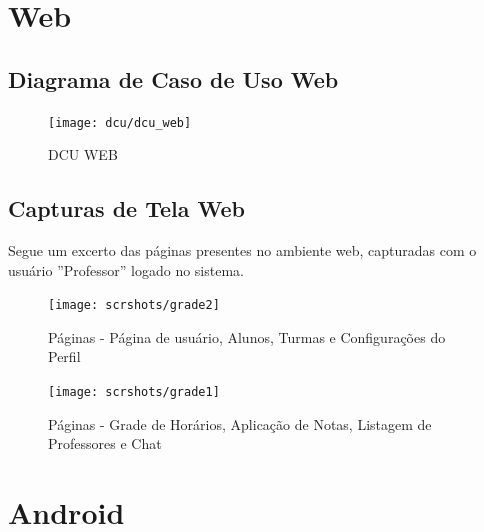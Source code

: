 \documentclass[main.tex]{subfiles}
\begin{document}
\section{Web}

\subsection{Diagrama de Caso de Uso Web}
\begin{figure}[H]
    \centering
    \texttt{[image: dcu/dcu\_web]}
    \caption{DCU WEB}
\end{figure}


%

\subsection{Capturas de Tela Web}
Segue um excerto das páginas presentes no ambiente web, capturadas com o usuário ''Professor'' logado no sistema.

\begin{figure}[H]
    \centering
    \hspace*{-0.7cm} %
    \texttt{[image: scrshots/grade2]}
    \centering
    \caption{Páginas - Página de usuário, Alunos, Turmas e Configurações do Perfil}
\end{figure}
\begin{figure}[H]
    \centering
    \hspace*{-0.7cm} %
    \texttt{[image: scrshots/grade1]}
    \caption{Páginas - Grade de Horários, Aplicação de Notas, Listagem de Professores e Chat}
\end{figure}


\section{Android}
\end{document}
